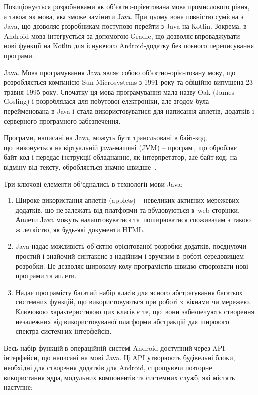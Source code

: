 \documentclass[../main.tex]{subfiles}
\begin{document}
Позиціонується розробниками як об'єктно-орієнтована мова промислового рівня, а також як мова, яка зможе замінити Java. При цьому вона повністю сумісна з Java, що дозволяє розробникам поступово перейти з Java на Kotlin. Зокрема, в Android мова інтегрується за допомогою Gradle, що дозволяє впроваджувати нові функції на Kotlin для існуючого Android-додатку без повного переписування програми.

Java.
Мова програмування Java являє собою об'єктно-орієнтовану мову, що розробляється компанією Sun Microsystems з 1991 року та офіційно випущена 23 травня 1995 року. Спочатку ця мова програмування  мала назву Oak (James Gosling) і розроблялася для побутової електроніки, але згодом була перейменована в Java і стала використовуватися для написання аплетів, додатків і серверного програмного забезпечення.

Програми, написані на Java, можуть бути трансльовані в байт-код, що~виконується на віртуальній java-машині (JVM) -- програмі, що обробляє байт-код і передає інструкції обладнанню, як інтерпретатор, але байт-код, на відміну від тексту, обробляється значно швидше~\cite{learn_java}.

Три ключові елементи об'єднались в технології мови Java:
\begin{enumerate}
	\item Широке використання аплетів (applets) -- невеликих активних мережевих додатків, що не залежать від платформи та вбудовуються в~web-сторінки. Аплети Java можуть налаштовуватися та~поширюватися споживачам з такою ж легкістю, як будь-які документи HTML.
	\item Java надає можливість об'єктно-орієнтованої розробки додатків, поєднуючи простий і знайомий синтаксис з надійним і зручним в~роботі середовищем розробки. Це дозволяє широкому колу програмістів швидко створювати нові програми та аплети.
	\item Надає програмісту багатий набір класів для ясного абстрагування багатьох системних функцій, що використовуються при роботі з~вікнами чи мережею. Ключовою характеристикою цих класів є те, що~вони забезпечують створення незалежних від використовуваної платформи абстракцій для широкого спектра системних інтерфейсів.
\end{enumerate}

Весь набір функцій в операційній системі Android доступний через API-інтерфейси, що написані на мові Java. Ці API утворюють будівельні блоки, необхідні для створення додатків для Android, спрощуючи повторне використання ядра, модульних компонентів та системних служб, які містять наступне:
\end{document}
